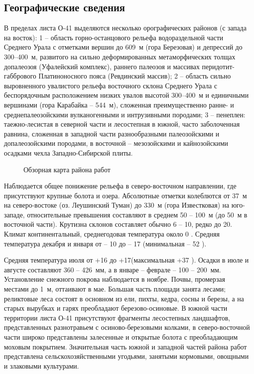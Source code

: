 \subsection*{Географические сведения}
В пределах листа О-41 выделяются несколько орографических районов (с запада на восток): 1 -- область горно-останцового рельефа водораздельной части Среднего Урала с отметками вершин до 609~м (гора Березовая) и депрессий до 300--400~м, развитого на сильно деформированных метаморфических толщах допалеозоя (Уфалейский комплекс), раннего палеозоя и массивах перидотит-габбрового Платиноносного пояса (Ревдинский массив); 2 -- область сильно выровненного увалистого рельефа восточного склона Среднего Урала с беспорядочным расположением низких
увалов высотой 300--400~м и единичными вершинами (гора Карабайка -- 544~м), сложенная преимущественно ранне- и среднепалеозойскими вулканогенными и интрузивными породами; 3  --  пенеплен: таежно-лесистая в северной части и лесостепная в южной, часто заболоченная равнина, сложенная в западной части разнообразными палеозойскими и допалеозойскими породами, в восточной  --  мезозойскими и кайнозойскими осадками чехла Западно-Сибирской плиты. 
\begin{figure}[h]
	\caption{Обзорная карта района работ}
\end{figure}
Наблюдается общее понижение рельефа в северо-восточном направлении, где присутствуют крупные болота и озера. Абсолютные отметки колеблются от 37~м на северо-востоке (оз. Леушинский Туман) до 330~м (гора Известковая) на юго-западе, относительные превышения составляют в среднем 50 -- 100~м (до 50~м в восточной части). Крутизна склонов составляет обычно 6 -- 10\degree, редко до 20\degree.
Климат континентальный, среднегодовая температура около 0 . Средняя температура декабря и января от  -- 10 до  -- 17  (минимальная  -- 52 ).

Средняя температура июля от +16 до +17\degree (максимальная +37 ). Осадки в июле и августе составляют 360 -- 426~мм, а в январе -- феврале  --  100 -- 200~мм.
Установление снежного покрова наблюдается в ноябре. Почвы, промерзая местами до 1~м, оттаивают в мае. Большая часть площади занята лесами; реликтовые леса состоят в основном из ели, пихты, кедра, сосны и березы, а на старых вырубках и гарях преобладают березово-осиновые. В южной части территории листа О-41 присутствуют фрагменты лесостепных ландшафтов, представленных разнотравьем с осиново-березовыми колками, в северо-восточной части широко представлены залесенные и открытые болота с преобладающим моховым покрытием. Значительная часть южной и западной частей района работ представлена сельскохозяйственными угодьями, занятыми кормовыми, овощными и злаковыми культурами. 

